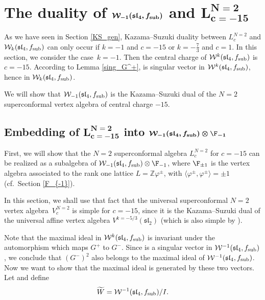 \section[The duality of W\_-1(sl\_4, f\_sub) and L\^{}N=2\_c=-15]{The duality of $\boldsymbol{\mathcal{W}_{-1}(\mathfrak{sl}_4, f_{\rm sub})}$ and $\boldsymbol{L^{N=2}_{c=-15}}$} \label{duality}


As we have seen in Section \ref{KS_gen}, Kazama--Suzuki duality between $L^{N=2}_c$ and $\mathcal W_k(\mathfrak{sl}_4, f_{\rm sub})$ can only occur if $k=-1$ and $c=-15$ or $k=-\frac{7}{3}$ and $c=1$.
In this section, we consider the case~${k=-1}$. Then the central charge of $\mathcal{W}^{k}(\mathfrak{sl}_4, f_{\rm sub})$ is $c = -15$. According to Lemma \ref{sing_G^+},  is singular vector in $\mathcal{W}^{k}(\mathfrak{sl}_4, f_{\rm sub})$, hence  in $\mathcal{W}_{k}(\mathfrak{sl}_4, f_{\rm sub})$.

 We will show that $\mathcal{W}_{-1}(\mathfrak{sl}_4, f_{\rm sub})$ is the Kazama--Suzuki dual of the $N=2$ superconformal vertex algebra of central charge $-15$.



\subsection[Embedding of L\^{}N=2\_c=-15 into W\_-1(sl\_4, f\_ ub)]{Embedding of $\boldsymbol{ L^{N=2}_{c=-15}}$ into $\boldsymbol{\mathcal{W}_{-1}(\mathfrak{sl}_4, f_{\rm sub}) \otimes \F_{-1}}$}

First, we will show that the $N=2$ superconformal algebra $L^{N=2}_{c}$ for $c=-15$ can be realized as a subalgebra of $\mathcal{W}_{-1}(\mathfrak{sl}_4, f_{\rm sub}) \otimes \F_{-1}$, where $\F_{\pm 1}$ is the vertex algebra associated to the rank one lattice $L= {\mathbb{Z}}\varphi^{\pm}$, with $\big\langle \varphi^{\pm}, \varphi^{\pm} \big\rangle = \pm 1$ (cf.\ Section \ref{F_{-1}}).

 In this section, we shall use that fact that the universal superconformal $N=2$ vertex algebra~$V^{N=2}_{c}$ is simple for $c=-15$, since it is the Kazama--Suzuki dual of the universal affine vertex algebra $V^{k=-5/3}(\mathfrak{sl}_2)$ (which is also simple by \cite{GK}).

 Note that the maximal ideal in $\mathcal W^k(\mathfrak{sl}_4, f_{\rm sub})$ is invariant under the automorphism which maps $G^+$ to $G^-$. Since  is a singular vector in $\mathcal{W}^{-1}(\mathfrak{sl}_4, f_{\rm sub}) $, we conclude that $(G^-)^2$ also belongs to the maximal ideal of $\mathcal{W}^{-1}(\mathfrak{sl}_4, f_{\rm sub}) $. Now we want to show that the maximal ideal is generated by these two vectors.
Let  and define
\[
 \widetilde W = \mathcal{W}^{-1}(\mathfrak{sl}_4, f_{\rm sub})/I.
 \]

